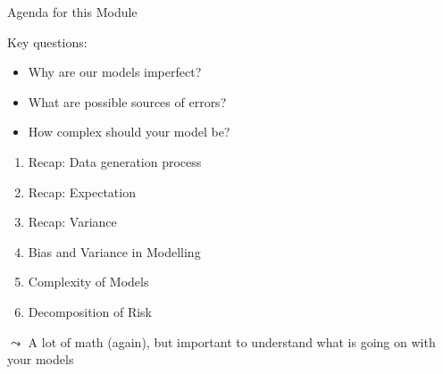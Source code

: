 \documentclass[aspectratio=169]{../latex_main/tntbeamer}  %
\begin{document}
	\begin{frame}{Agenda for this Module}

 Key questions: 
    \begin{itemize} 
        \item Why are our models imperfect?
        \item What are possible sources of errors?
        \item How complex should your model be?
    \end{itemize}
            
    \pause
    \medskip
    
    \begin{enumerate}
        \item Recap: Data generation process
        \item Recap: Expectation
        \item Recap: Variance
        \item Bias and Variance in Modelling
        \item Complexity of Models
        \item Decomposition of Risk
    \end{enumerate}

    \pause
    \medskip

    $\leadsto$ A lot of math (again), but important to understand what is going on with your models

	\end{frame}
	
\end{document}
